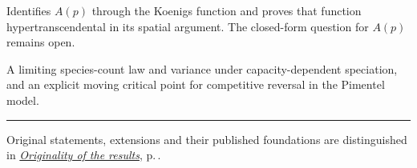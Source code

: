   {}
  {Identifies $A(p)$ through the Koenigs function and proves that
   function hypertranscendental in its spatial argument. The closed-form
   question for $A(p)$ remains open.}

  {}
  {A limiting species-count law and variance under capacity-dependent
   speciation, and an explicit moving critical point for competitive
   reversal in the Pimentel model.}

{\color{oirule}\rule{\linewidth}{0.5pt}\par}
\vspace{6pt}
{\footnotesize\color{oisoft}
Original statements, extensions and their published foundations are
distinguished in \hyperref[oi:details]{\textit{Originality of the results}},
p.\,\pageref{oi:details}.\par}
\endgroup
\clearpage
